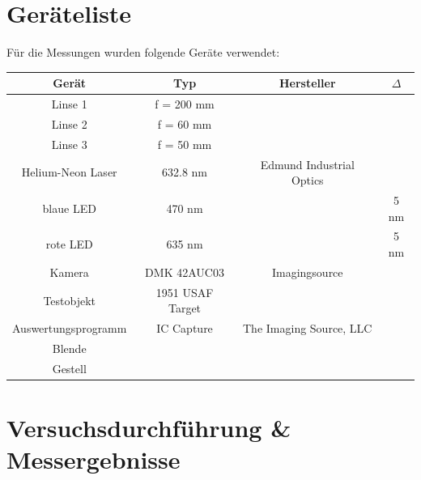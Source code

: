 \documentclass[11pt,ngerman]{scrartcl}
\begin{document}
\vspace{5mm}

\section{Geräteliste}

Für die Messungen wurden folgende Geräte verwendet:
\begin{center}
	\begin{tabular}{|c|c|c|c|} \hline
		\textbf{Gerät}      & \textbf{Typ}     & \textbf{Hersteller}      & $\Delta$ \\ \hline
		Linse 1             & f = 200 mm       &                          &          \\ \hline
		Linse 2             & f = 60 mm        &                          &          \\ \hline
		Linse 3             & f = 50 mm        &                          &          \\ \hline
		Helium-Neon Laser   & 632.8 nm         & Edmund Industrial Optics &          \\ \hline
		blaue LED           & 470 nm           &                          & 5 nm     \\ \hline
		rote LED            & 635 nm           &                          & 5 nm     \\ \hline
		Kamera              & DMK 42AUC03      & Imagingsource            &          \\ \hline
		Testobjekt          & 1951 USAF Target &                          &          \\ \hline
		Auswertungsprogramm & IC Capture       & The Imaging Source, LLC  &          \\ \hline
		Blende              &                  &                          &          \\ \hline
		Gestell             &                  &                          &          \\ \hline
	\end{tabular}
\end{center}

\newpage

\section{Versuchsdurchführung \& Messergebnisse}\label{sec:Versuchsdurchführung}
\end{document}
